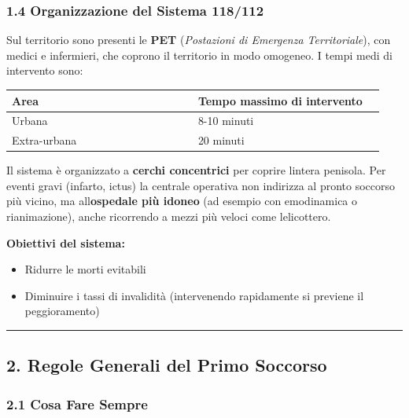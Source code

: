 \documentclass[a4paper,11pt]{article}
\providecommand{\tightlist}{%
  \setlength{\itemsep}{0pt}\setlength{\parskip}{0pt}}
\begin{document}
\subsubsection{1.4 Organizzazione del Sistema
      118/112}\label{organizzazione-del-sistema-118112}

Sul territorio sono presenti le \textbf{PET} (\emph{Postazioni di
      Emergenza Territoriale}), con medici e infermieri, che coprono il
territorio in modo omogeneo. I tempi medi di intervento sono:

\begin{longtable}[]{@{}p{0.47\linewidth}p{0.47\linewidth}@{}}
      \toprule\noalign{}
      Area         & Tempo massimo di intervento \\
      \midrule\noalign{}
      \endhead
      \bottomrule\noalign{}
      \endlastfoot
      Urbana       & 8-10 minuti                 \\
      Extra-urbana & 20 minuti                   \\
\end{longtable}

Il sistema è organizzato a \textbf{cerchi concentrici} per coprire
l\textquotesingle intera penisola. Per eventi gravi (infarto, ictus) la
centrale operativa non indirizza al pronto soccorso più vicino, ma
all\textquotesingle{}\textbf{ospedale più idoneo} (ad esempio con
emodinamica o rianimazione), anche ricorrendo a mezzi più veloci come
l\textquotesingle elicottero.

\textbf{Obiettivi del sistema:}

\begin{itemize}
      \tightlist
      \item
            Ridurre le morti evitabili
      \item
            Diminuire i tassi di invalidità (intervenendo rapidamente si previene
            il peggioramento)
\end{itemize}

\begin{center}\rule{0.5\linewidth}{0.5pt}\end{center}

\subsection{2. Regole Generali del Primo
      Soccorso}\label{regole-generali-del-primo-soccorso}

\subsubsection{2.1 Cosa Fare Sempre}\label{cosa-fare-sempre}
\end{document}
